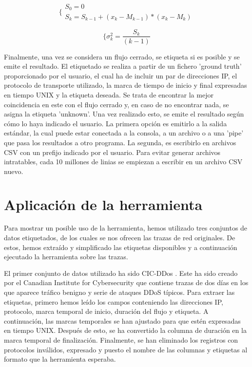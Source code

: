 \documentclass[10pt,a4paper,twoside]{article}
\begin{document}
\begin{multicols*}{2}
    \begin{equation} \label{eq:sqrrec}
    \biggl\{
        \begin{array}{l}
            S_{0} = 0 \\
            S_{k} = S_{k-1} + ( x_{k} - M_{k-1} ) * ( x_{k} - M_{k} )
        \end{array}      
    \end{equation}
    
    \begin{equation} \label{eq:variancereq}
    \biggl\{
        \sigma^2_{k} = {\frac{S_{k}}{(k - 1)}}
    \end{equation}

    Finalmente, una vez se considera un flujo cerrado, se etiqueta si es posible y se emite el resultado. El etiquetado se realiza a partir de un fichero 'ground truth' proporcionado por el usuario, el cual ha de incluir un par de direcciones IP, el protocolo de transporte utilizado, la marca de tiempo de inicio y final expresadas en tiempo UNIX y la etiqueta deseada. Se trata de encontrar la mejor coincidencia en este con el flujo cerrado y, en caso de no encontrar nada, se asigna la etiqueta 'unknown'. Una vez realizado esto, se emite el resultado según cómo lo haya indicado el usuario. La primera opción es emitirlo a la salida estándar, la cual puede estar conectada a la consola, a un archivo o a una 'pipe' que pasa los resultados a otro programa. La segunda, es escribirlo en archivos CSV con un prefijo indicado por el usuario. Para evitar generar archivos intratables, cada 10 millones de linias se empiezan a escribir en un archivo CSV nuevo.

    \section{Aplicación de la herramienta} \label{casoexec}

    Para mostrar un posible uso de la herramienta, hemos utilizado tres conjuntos de datos etiquetados, de los cuales se nos ofrecen las trazas de red originales. De estos, hemos extraído y simplificado las etiquetas disponibles y a continuación ejecutado la herramienta sobre las trazas.

    El primer conjunto de datos utilizado ha sido CIC-DDos \cite{8888419}. Este ha sido creado por el Canadian Institute for Cybersecurity que contiene trazas de dos días en los que aparece tráfico benigno y serie de ataques DDoS típicos. Para extraer las etiquetas, primero hemos leído los campos conteniendo las direcciones IP, protocolo, marca temporal de inicio, duración del flujo y etiqueta. A continuación, las marcas temporales se han ajustado para que estén expresadas en tiempo UNIX. Después de esto, se ha convertido la columna de duración en la marca temporal de finalización. Finalmente, se han eliminado los registros con protocolos inválidos, expresado y puesto el nombre de las columnas y etiquetas al formato que la herramienta esperaba.
    

\end{multicols*}
\end{document}
